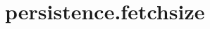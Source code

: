 \section{persistence.fetchsize}
\label{configuration:PersistenceFetchsize}
\AvailableInJavaOnly{\TODO}